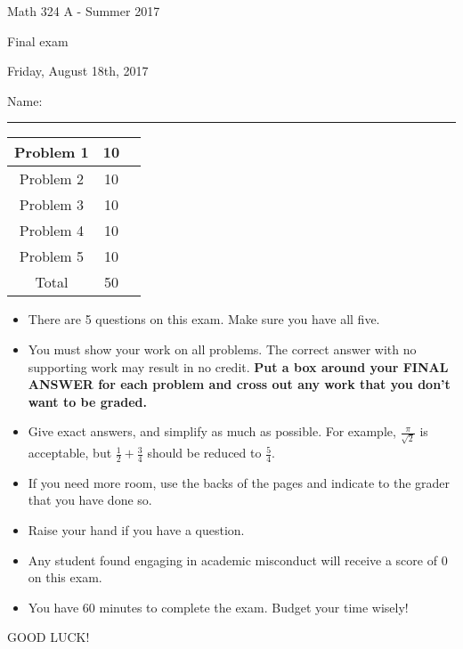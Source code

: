 \documentclass[12 pt]{report}
\begin{document}
\noindent \vfill \noindent \large

\centerline{Math 324 A  - Summer 2017}

\centerline{Final exam}

\centerline{Friday, August 18th, 2017}

\normalsize

\vfill
\medskip
Name: \rule{10cm}{1pt}

\bigskip

\vfill
\begin{center}
{\large
\begin{tabular}{||c|c|r||}
\hline Problem 1 & 10 & \hspace{10mm} \hfill \\
\hline Problem 2 & 10  & \hspace{10mm} \hfill \\
\hline Problem 3 & 10 & \hspace{10mm} \hfill \\
\hline Problem 4 & 10  & \hspace{10mm} \hfill \\
\hline Problem 5 & 10  & \hspace{10mm} \hfill \\
\hline Total & 50 & \hspace{10mm} \hfill \\
\hline
\end{tabular}
}
\end{center}
\vfill
\begin{itemize}
\item There are 5 questions on this exam. Make sure you have all five.
\item You must show your work on all problems.  The correct answer
with no supporting work may result in no credit. \textbf{Put a box
around your FINAL ANSWER for each problem and cross out any work
that you don't want to be graded.} 
\item Give exact answers, and simplify as much as possible. 
For example, $\frac{\pi}{\sqrt{2}}$ is acceptable, but $\frac{1}{2} + \frac{3}{4}$
should be reduced to $\frac{5}{4}$.   

\item If you need more room, use the backs
of the pages and indicate to the grader that you have done so.
\item Raise your hand if you have a question.
\item Any student found engaging in academic misconduct will receive
a score of 0 on this exam.
\item You have 60 minutes to complete the exam.  Budget your time wisely! \\
\end{itemize}
\vfill
\begin{center}GOOD LUCK!\end{center}
\end{document}

